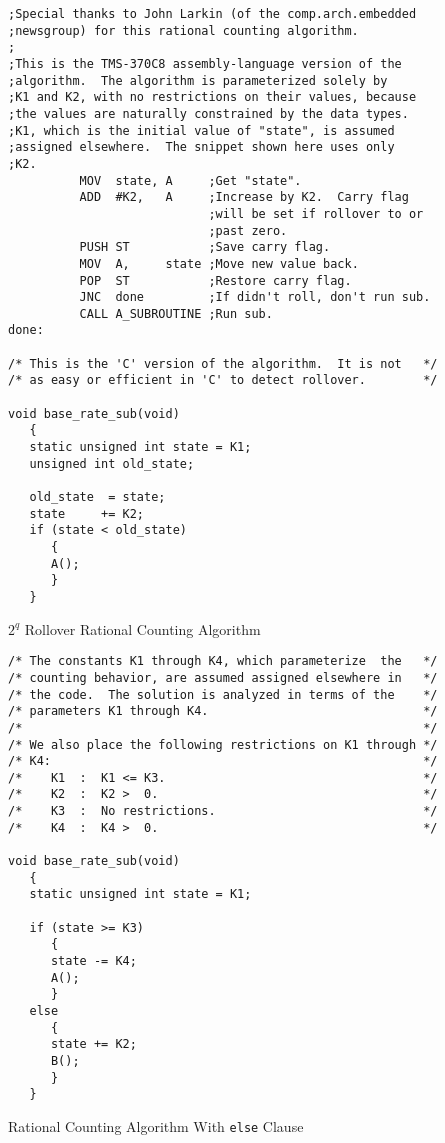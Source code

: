 \begin{algorithm}
\begin{verbatim}
;Special thanks to John Larkin (of the comp.arch.embedded
;newsgroup) for this rational counting algorithm.
;
;This is the TMS-370C8 assembly-language version of the 
;algorithm.  The algorithm is parameterized solely by
;K1 and K2, with no restrictions on their values, because
;the values are naturally constrained by the data types.  
;K1, which is the initial value of "state", is assumed
;assigned elsewhere.  The snippet shown here uses only
;K2.
          MOV  state, A     ;Get "state".
          ADD  #K2,   A     ;Increase by K2.  Carry flag
                            ;will be set if rollover to or
                            ;past zero.
          PUSH ST           ;Save carry flag.
          MOV  A,     state ;Move new value back.
          POP  ST           ;Restore carry flag.
          JNC  done         ;If didn't roll, don't run sub.
          CALL A_SUBROUTINE ;Run sub.
done:

/* This is the 'C' version of the algorithm.  It is not   */
/* as easy or efficient in 'C' to detect rollover.        */

void base_rate_sub(void)
   {
   static unsigned int state = K1;
   unsigned int old_state;

   old_state  = state;
   state     += K2;
   if (state < old_state)
      {
      A();
      }
   }
\end{verbatim}
\caption{$2^q$ Rollover Rational Counting Algorithm}
\label{alg:crat0:sfdv0:01d}
\end{algorithm}

\begin{algorithm}
\begin{verbatim}
/* The constants K1 through K4, which parameterize  the   */
/* counting behavior, are assumed assigned elsewhere in   */
/* the code.  The solution is analyzed in terms of the    */
/* parameters K1 through K4.                              */
/*                                                        */
/* We also place the following restrictions on K1 through */
/* K4:                                                    */
/*    K1  :  K1 <= K3.                                    */
/*    K2  :  K2 >  0.                                     */
/*    K3  :  No restrictions.                             */
/*    K4  :  K4 >  0.                                     */

void base_rate_sub(void)
   {
   static unsigned int state = K1;

   if (state >= K3)
      {
      state -= K4;
      A();
      }
   else
      {
      state += K2;
      B();
      }
   }
\end{verbatim}
\caption{Rational Counting Algorithm With \texttt{else} Clause}
\label{alg:crat0:sfdv0:02a}
\end{algorithm}


